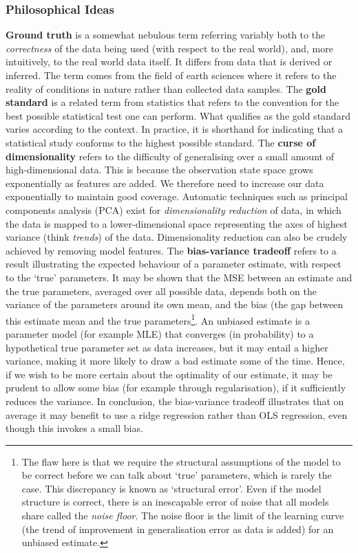 \documentclass[11pt]{amsart}
\begin{document}
\subsubsection{Philosophical Ideas}

\textbf{Ground truth} is a somewhat nebulous term referring variably both to the \emph{correctness} of the data being used (with respect to the real world), and, more intuitively, to the real world data itself. It differs from data that is derived or inferred. The term comes from the field of earth sciences where it refers to the reality of conditions in nature rather than collected data samples. The \textbf{gold standard} is a related term from statistics that refers to the convention for the best possible statistical test one can perform. What qualifies as the gold standard varies according to the context. In practice, it is shorthand for indicating that a statistical study conforms to the highest possible standard. The \textbf{curse of dimensionality} refers to the difficulty of generalising over a small amount of high-dimensional data. This is because the observation state space grows exponentially as features are added. We therefore need to increase our data exponentially to maintain good coverage. Automatic techniques such as principal components analysis (PCA) exist for \emph{dimensionality reduction} of data, in which the data is mapped to a lower-dimensional space representing the axes of highest variance (think \emph{trends}) of the data. Dimensionality reduction can also be crudely achieved by removing model features. The \textbf{bias-variance tradeoff} refers to a result illustrating the expected behaviour of a parameter estimate, with respect to the `true' parameters. It may be shown that the MSE between an estimate and the true parameters, averaged over all possible data, depends both on the variance of the parameters around its own mean, and the bias (the gap between this estimate mean and the true parameters\footnote{The flaw here is that we require the structural assumptions of the model to be correct before we can talk about `true' parameters, which is rarely the case. This discrepancy is known as `structural error'. Even if the model structure is correct, there is an inescapable error of noise that all models share called the \emph{noise floor}. The noise floor is the limit of the learning curve (the trend of improvement in generalisation error as data is added) for an unbiased estimate.}. An unbiased estimate is a parameter model (for example MLE) that converges (in probability) to a hypothetical true parameter set as data increases, but it may entail a higher variance, making it more likely to draw a bad estimate some of the time. Hence, if we wish to be more certain about the optimality of our estimate, it may be prudent to allow some bias (for example through regularisation), if it sufficiently reduces the variance. In conclusion, the bias-variance tradeoff illustrates that on average it may benefit to use a ridge regression rather than OLS regression, even though this invokes a small bias.
\end{document}

